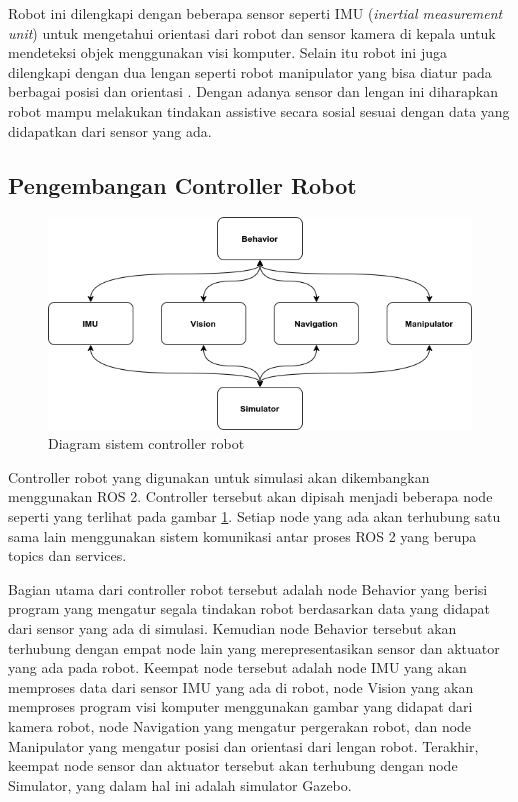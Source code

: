 Robot ini dilengkapi dengan beberapa sensor seperti IMU (\emph{inertial measurement unit}) untuk mengetahui orientasi dari robot dan sensor kamera di kepala untuk mendeteksi objek menggunakan visi komputer.
Selain itu robot ini juga dilengkapi dengan dua lengan seperti robot manipulator yang bisa diatur pada berbagai posisi dan orientasi \citep{Iqbal2012}.
Dengan adanya sensor dan lengan ini diharapkan robot mampu melakukan tindakan assistive secara sosial sesuai dengan data yang didapatkan dari sensor yang ada.

\subsection{Pengembangan Controller Robot}

\begin{figure} [ht] \centering
	\includegraphics[scale=0.45]{gambar/robot-controller.png}
	\caption{Diagram sistem controller robot}
	\label{fig:RobotController}
\end{figure}

Controller robot yang digunakan untuk simulasi akan dikembangkan menggunakan ROS 2.
Controller tersebut akan dipisah menjadi beberapa node seperti yang terlihat pada gambar \ref{fig:RobotController}.
Setiap node yang ada akan terhubung satu sama lain menggunakan sistem komunikasi antar proses ROS 2 yang berupa topics dan services.

Bagian utama dari controller robot tersebut adalah node Behavior yang berisi program yang mengatur segala tindakan robot berdasarkan data yang didapat dari sensor yang ada di simulasi.
Kemudian node Behavior tersebut akan terhubung dengan empat node lain yang merepresentasikan sensor dan aktuator yang ada pada robot.
Keempat node tersebut adalah node IMU yang akan memproses data dari sensor IMU yang ada di robot, node Vision yang akan memproses program visi komputer menggunakan gambar yang didapat dari kamera robot, node Navigation yang mengatur pergerakan robot, dan node Manipulator yang mengatur posisi dan orientasi dari lengan robot.
Terakhir, keempat node sensor dan aktuator tersebut akan terhubung dengan node Simulator, yang dalam hal ini adalah simulator Gazebo.

